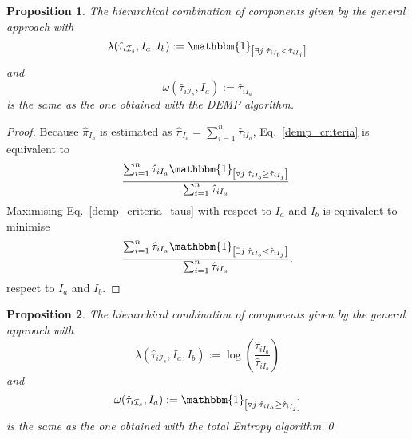 \documentclass[10pt, a4paper]{article}
\newtheorem{prop}{Proposition}
\begin{document}
\begin{prop}
The hierarchical combination of components given by the general approach with
\[
\lambda(\hat{\tau}_{i \mathcal{I}_s}, I_a, I_b) := \mathbbm{1}_{\left[ \exists j\; \hat{\tau}_{i I_{b}} < \hat{\tau}_{iI_j} \right]}
\]
and
\[
\omega(\hat{\tau}_{i \mathcal{I}_s}, I_a) := \hat{\tau}_{iI_a}
\]
is the same as the one obtained with the DEMP algorithm.
\end{prop}
\begin{proof}
Because $\hat{\pi}_{I_a}$ is estimated as $\hat{\pi}_{I_a} = \sum_{i=1}^n \hat{\tau}_{iI_a}$, Eq.~\ref{demp_criteria} is equivalent to
\begin{equation}\label{demp_criteria_taus}
\frac{ \sum_{i=1}^n {\hat{\tau}_{iI_a} \mathbbm{1}_{\left[ \forall j\; \hat{\tau}_{i I_{b}} \geq \hat{\tau}_{iI_j} \right]}}}{  \sum_{i=1}^n \hat{\tau}_{iI_a}}.
\end{equation}
Maximising Eq.~\ref{demp_criteria_taus} with respect to $I_a$ and $I_b$ is equivalent to minimise
\[
\frac{ \sum_{i=1}^n {\hat{\tau}_{iI_a} \mathbbm{1}_{\left[ \exists j\; \hat{\tau}_{i I_{b}} < \hat{\tau}_{iI_j} \right]}}}{  \sum_{i=1}^n \hat{\tau}_{iI_a}}.
\]
respect to $I_a$ and $I_b$.
\end{proof}

\begin{prop}
The hierarchical combination of components given by the general approach with
\[
\lambda(\hat{\tau}_{i \mathcal{I}_s}, I_a, I_b) := \log( \frac{ \hat{\tau}_{iI_a} }{ \hat{\tau}_{iI_b} })
\]
and
\[
\omega(\hat{\tau}_{i \mathcal{I}_s}, I_a) := \mathbbm{1}_{\left[ \forall j\; \hat{\tau}_{i I_{a}} \geq \hat{\tau}_{iI_j} \right]}
\]
is the same as the one obtained with the total Entropy algorithm.\qed
\end{prop}




{}
\end{document}
